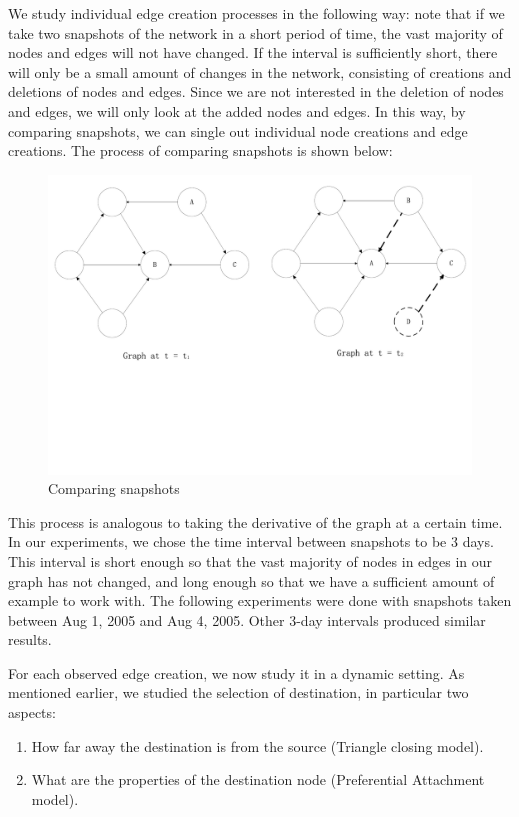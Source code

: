 \documentclass[10pt,twocolumn]{article}
\begin{document}
We study individual edge creation processes in the following way: note that if we take two snapshots of the network in a short period of time, the vast majority of nodes and edges will not have changed. If the interval is sufficiently short, there will only be a small amount of changes in the network, consisting of creations and deletions of nodes and edges. Since we are not interested in the deletion of nodes and edges, we will only look at the added nodes and edges. In this way, by comparing snapshots, we can single out individual node creations and edge creations. The process of comparing snapshots is shown below:
\begin{figure}[ht]
    \centering
        \includegraphics[scale = 0.25, trim = 0cm 8cm 0cm 0cm,clip=true]{./graphs/dynamic.pdf}
    \caption{Comparing snapshots} \label{fig:compare}
\end{figure}

This process is analogous to taking the derivative of the graph at a certain time. In our experiments, we chose the time interval between snapshots to be 3 days. This interval is short enough so that the vast majority of nodes in edges in our graph has not changed, and long enough so that we have a sufficient amount of example to work with. The following experiments were done with snapshots taken between Aug 1, 2005 and Aug 4, 2005. Other 3-day intervals produced similar results.

For each observed edge creation, we now study it in a dynamic setting. As mentioned earlier, we studied the selection of destination, in particular two aspects:
\begin{enumerate}
\item How far away the destination is from the source (Triangle closing model).
\item What are the properties of the destination node (Preferential Attachment model).
\end{enumerate}
\end{document}
